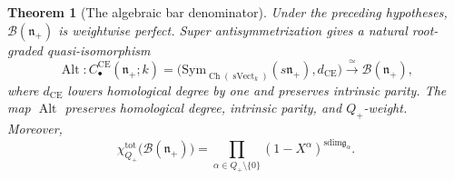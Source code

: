 \documentclass[11pt,reqno]{amsart}
\newtheorem{theorem}{Theorem}[section]
\theoremstyle{definition}
\theoremstyle{remark}
\providecommand{\Sym}{\mathrm{Sym}}
\providecommand{\sdim}{\mathrm{sdim}}
\providecommand{\CE}{\mathrm{CE}}
\begin{document}
\begin{theorem}[The algebraic bar denominator]
\label{thm:algebraic-denominator}
Under the preceding hypotheses,
\(\mathcal B(\mathfrak n_+)\) is weightwise perfect.  Super
antisymmetrization gives a natural root-graded quasi-isomorphism
\[
 \operatorname{Alt}:
 C_\bullet^{\CE}(\mathfrak n_+;k)
 =
 \bigl(\Sym_{\operatorname{Ch}(\operatorname{sVect}_k)}
       (s\mathfrak n_+),d_{\CE}\bigr)
 \xrightarrow{\ \simeq\ }
 \mathcal B(\mathfrak n_+),
\]
where \(d_{\CE}\) lowers homological degree by one and preserves
intrinsic parity.  The map \(\operatorname{Alt}\) preserves homological
degree, intrinsic parity, and \(Q_+\)-weight.  Moreover,
\[
 \chi_{Q_+}^{\mathrm{tot}}\bigl(\mathcal B(\mathfrak n_+)\bigr)
 =
 \prod_{\alpha\in Q_+\setminus\{0\}}
 (1-X^\alpha)^{\sdim\mathfrak g_\alpha}.
\]
\end{theorem}
\end{document}
